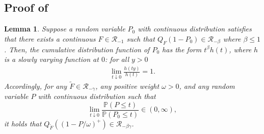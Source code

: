 \documentclass[12pt]{article}
\theoremstyle{plain}
\theoremstyle{plain}
\newtheorem{lem}{Lemma}[section]
\theoremstyle{definition}
\renewcommand{\Pr}{\mathbb{P}}
\begin{document}
\subsection{Proof of }
\label{subsec:proof-power-increasing}
\begin{lem}
\label{lemma:assmp-1-iii-ensure-rv}
Suppose a random variable $P_0$ with continuous distribution satisfies that there exists a continuous $F\in\mathscr{R}_{-1}$ such that $Q_F(1-P_0)\in\mathscr{R}_{-\beta}$ where $\beta\le1$. Then, the cumulative distribution function of $P_0$ has the form $t^\beta h(t)$, where $h$ is a slowly varying function at $0$: for all $y>0$
\begin{align} \label{eq:slowvary}
  \lim_{t\downarrow0}\frac{h(ty)}{h(t)}=1.  
\end{align}
Accordingly, for any $\tilde{F}\in\mathscr{R}_{-\gamma}$, any positive weight $\omega>0$, and any random variable $P$ with continuous distribution such that
\[
\lim_{t\downarrow0}\frac{\Pr(P\le t)}{\Pr(P_0\le t)}\in(0,\infty),
\]
it holds that $Q_{\tilde{F}}((1-P/\omega)^+)\in\mathscr{R}_{-\beta\gamma}$.
\end{lem}
\end{document}
